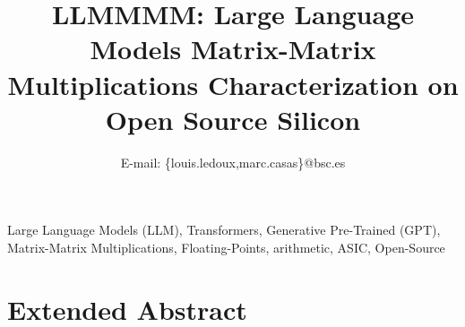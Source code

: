 \documentclass[10pt,conference,letterpaper]{IEEEtran}
\begin{document}

\title{LLMMMM: Large Language Models Matrix-Matrix Multiplications Characterization on Open Source Silicon}

\author{

E-mail: \{louis.ledoux,marc.casas\}@bsc.es\\

}

\maketitle


\begin{keywords}
	Large Language Models (LLM), Transformers, Generative Pre-Trained (GPT), Matrix-Matrix Multiplications, Floating-Points, arithmetic, ASIC, Open-Source
\end{keywords}

\vspace{-4mm}
\section{Extended Abstract}




\IEEEpeerreviewmaketitle

\vspace{-2mm}


\vspace{-2mm}

\balance

%


\vspace{-7mm}
\end{document}
